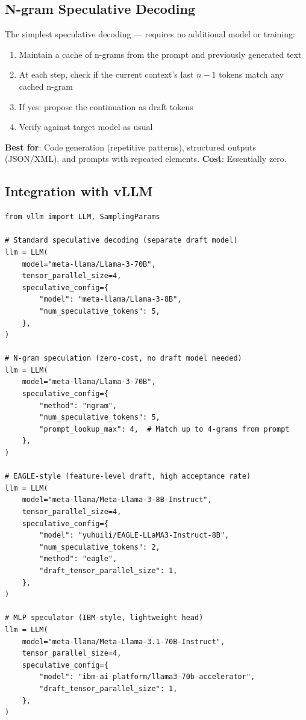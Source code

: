 \subsection{N-gram Speculative Decoding}
\label{n-gram-speculative-decoding}

\begin{keybox}
The simplest speculative decoding --- requires no additional model or training:

\begin{enumerate}
  \item Maintain a cache of n-grams from the prompt and previously generated text
  \item At each step, check if the current context’s last $n-1$ tokens match any cached n-gram
  \item If yes: propose the continuation as draft tokens
  \item Verify against target model as usual
\end{enumerate}

\textbf{Best for}: Code generation (repetitive patterns), structured outputs (JSON/XML), and prompts with repeated elements. \textbf{Cost}: Essentially zero.
\end{keybox}

\newpage
\subsection{Integration with vLLM}
\label{integration-with-vllm}

\begin{lstlisting}[style=pythonstyle]
from vllm import LLM, SamplingParams

# Standard speculative decoding (separate draft model)
llm = LLM(
    model="meta-llama/Llama-3-70B",
    tensor_parallel_size=4,
    speculative_config={
        "model": "meta-llama/Llama-3-8B",
        "num_speculative_tokens": 5,
    },
)

# N-gram speculation (zero-cost, no draft model needed)
llm = LLM(
    model="meta-llama/Llama-3-70B",
    speculative_config={
        "method": "ngram",
        "num_speculative_tokens": 5,
        "prompt_lookup_max": 4,  # Match up to 4-grams from prompt
    },
)

# EAGLE-style (feature-level draft, high acceptance rate)
llm = LLM(
    model="meta-llama/Meta-Llama-3-8B-Instruct",
    tensor_parallel_size=4,
    speculative_config={
        "model": "yuhuili/EAGLE-LLaMA3-Instruct-8B",
        "num_speculative_tokens": 2,
        "method": "eagle",
        "draft_tensor_parallel_size": 1,
    },
)

# MLP speculator (IBM-style, lightweight head)
llm = LLM(
    model="meta-llama/Meta-Llama-3.1-70B-Instruct",
    tensor_parallel_size=4,
    speculative_config={
        "model": "ibm-ai-platform/llama3-70b-accelerator",
        "draft_tensor_parallel_size": 1,
    },
)
\end{lstlisting}

